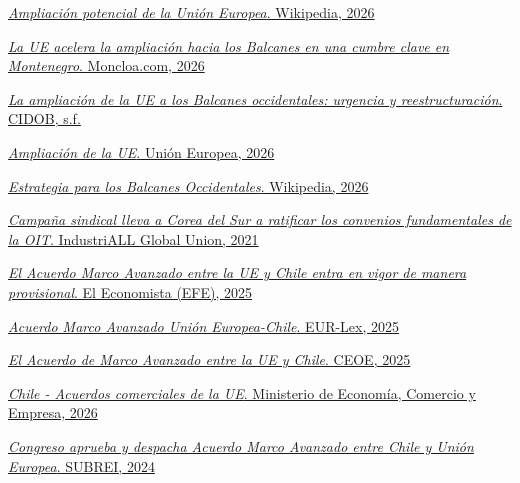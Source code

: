 \documentclass[10pt,a4paper]{article}
\begin{document}
\href{https://es.wikipedia.org/wiki/Ampliaci%C3%B3n_potencial_de_la_Uni%C3%B3n_Europea}{\textit{Ampliación potencial de la Unión Europea}. Wikipedia, 2026}

\href{https://www.moncloa.com/2026/06/04/ampliacion-ue-balcanes-cumbre-montenegro-3382141}{\textit{La UE acelera la ampliación hacia los Balcanes en una cumbre clave en Montenegro}. Moncloa.com, 2026}

\href{https://www.cidob.org/publicaciones/la-ampliacion-de-la-ue-los-balcanes-occidentales-urgencia-y-reestructuracion}{\textit{La ampliación de la UE a los Balcanes occidentales: urgencia y reestructuración}. CIDOB, s.f.}

\href{https://european-union.europa.eu/principles-countries-history/eu-enlargement_es}{\textit{Ampliación de la UE}. Unión Europea, 2026}

\href{https://es.wikipedia.org/wiki/Estrategia_para_los_Balcanes_Occidentales}{\textit{Estrategia para los Balcanes Occidentales}. Wikipedia, 2026}

\href{https://www.industriall-union.org/es/campana-sindical-lleva-a-corea-del-sur-a-ratificar-los-convenios-fundamentales-de-la-oit}{\textit{Campaña sindical lleva a Corea del Sur a ratificar los convenios fundamentales de la OIT}. IndustriALL Global Union, 2021}

\href{https://www.eleconomista.es/economia/noticias/13404061/06/25/el-acuerdo-marco-avanzado-entre-la-ue-y-chile-entra-en-vigor-de-manera-provisional.html}{\textit{El Acuerdo Marco Avanzado entre la UE y Chile entra en vigor de manera provisional}. El Economista (EFE), 2025}

\href{https://eur-lex.europa.eu/ES/legal-content/summary/eu-chile-advanced-framework-agreement.html?fromSummary=07}{\textit{Acuerdo Marco Avanzado Unión Europea-Chile}. EUR-Lex, 2025}

\href{https://www.ceoe.es/sites/ceoe-corporativo/files/content/file/2025/02/21/104/el-acuerdo-de-marco-avanzado-entre-la-ue-y-chile.pdf}{\textit{El Acuerdo de Marco Avanzado entre la UE y Chile}. CEOE, 2025}

\href{https://comercio.gob.es/PoliticaComercialUE/AcuerdosComerciales/Paginas/Chile.aspx}{\textit{Chile - Acuerdos comerciales de la UE}. Ministerio de Economía, Comercio y Empresa, 2026}

\href{https://www.subrei.gob.cl/sala-de-prensa/noticias/detalle-noticias/2024/11/13/congreso-aprueba-y-despacha-acuerdo-marco-avanzado-entre-chile---uni%C3%B3n-europea}{\textit{Congreso aprueba y despacha Acuerdo Marco Avanzado entre Chile y Unión Europea}. SUBREI, 2024}
\end{document}
